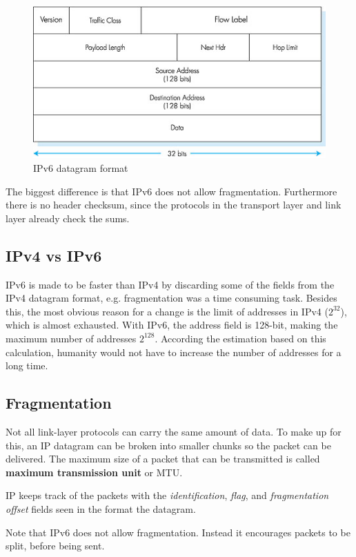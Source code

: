\begin{figure}
  \begin{center}
    \includegraphics[scale=1.5]{04-40.jpg}
  \end{center}
  \caption{IPv6 datagram format}
\end{figure}

The biggest difference is that IPv6 does not allow
fragmentation. Furthermore there is no header checksum, since the
protocols in the transport layer and link layer already check the
sums.

\subsection{IPv4 vs IPv6}
IPv6 is made to be faster than IPv4 by discarding some of the fields
from the IPv4 datagram format, e.g. fragmentation was a time consuming
task. Besides this, the most obvious reason for a change is the limit
of addresses in IPv4 ($2^{32}$), which is almost exhausted. With IPv6,
the address field is 128-bit, making the maximum number of addresses
$2^{128}$. According the estimation based on this calculation,
humanity would not have to increase the number of addresses for a long time.

\subsection{Fragmentation}
Not all link-layer protocols can carry the same amount of data. To
make up for this, an IP datagram can be broken into smaller chunks so
the packet can be delivered. The maximum size of a packet that can be
transmitted is called \textbf{maximum transmission unit} or MTU.

IP keeps track of the packets with the \textit{identification},
\textit{flag}, and \textit{fragmentation offset} fields seen in the
format the datagram.

Note that IPv6 does not allow fragmentation. Instead it encourages
packets to be split, before being sent.